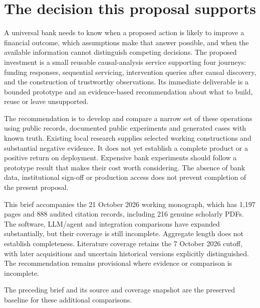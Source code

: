 \hypertarget{the-decision-this-proposal-supports}{%
\section{The decision this proposal
supports}\label{the-decision-this-proposal-supports}}

A universal bank needs to know when a proposed action is likely to
improve a financial outcome, which assumptions make that answer
possible, and when the available information cannot distinguish
competing decisions. The proposed investment is a small reusable
causal-analysis service supporting four journeys: funding responses,
sequential servicing, intervention queries after causal discovery, and
the construction of trustworthy observations. Its immediate deliverable
is a bounded prototype and an evidence-based recommendation about what
to build, reuse or leave unsupported.

The recommendation is to develop and compare a narrow set of these
operations using public records, documented public experiments and
generated cases with known truth. Existing local research supplies
selected working constructions and substantial negative evidence. It
does not yet establish a complete product or a positive return on
deployment. Expensive bank experiments should follow a prototype result
that makes their cost worth considering. The absence of bank data,
institutional sign-off or production access does not prevent completion
of the present proposal. \citep{sp13_scope}

This brief accompanies the 21 October 2026 working monograph, which has
1,197 pages and 888 audited citation records, including 216 genuine
scholarly PDFs. The software, LLM/agent and integration comparisons have
expanded substantially, but their coverage is still incomplete.
Aggregate length does not establish completeness. Literature coverage
retains the 7 October 2026 cutoff, with later acquisitions and uncertain
historical versions explicitly distinguished. The recommendation remains
provisional where evidence or comparison is incomplete.
\citep{sp21gs_reader,sp21eo_reader,sp21tr_reader,sp21ae_reader,sp21gr_reader,sp21ck_reader,sp21cx_reader,sp20md_reader,sp20gf_reader,sp20hy_reader,sp20je_reader,sp20nc_reader,sp20gc_reader,sp20ea_reader,sp20vm_reader,sp20pye_reader,sp20fx_reader,sp20pa_reader,sp20rfx_reader}

The preceding brief and its source and coverage snapshot are the
preserved baseline for these additional comparisons.
\citep{sp18_reader,sp18_progress,sp18_census,sp19rs_reader,sp19rs_progress,sp19em_reader,sp19em_progress,sp19oi_reader,sp19oi_progress}


